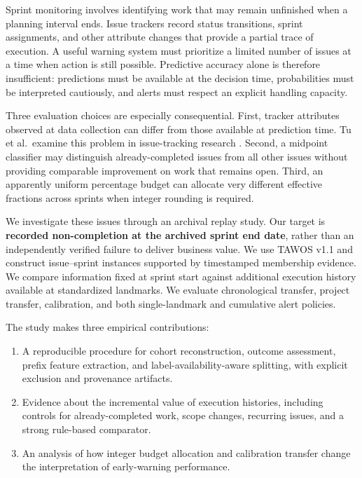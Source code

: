 \documentclass[11pt,a4paper]{article}
\providecommand{\tightlist}{\setlength{\itemsep}{0pt}\setlength{\parskip}{0pt}}
\begin{document}
Sprint monitoring involves identifying work that may remain unfinished when a planning interval ends. Issue trackers record status transitions, sprint assignments, and other attribute changes that provide a partial trace of execution. A useful warning system must prioritize a limited number of issues at a time when action is still possible. Predictive accuracy alone is therefore insufficient: predictions must be available at the decision time, probabilities must be interpreted cautiously, and alerts must respect an explicit handling capacity.

Three evaluation choices are especially consequential. First, tracker attributes observed at data collection can differ from those available at prediction time. Tu et al.~examine this problem in issue-tracking research \cite{tu2018careful}. Second, a midpoint classifier may distinguish already-completed issues from all other issues without providing comparable improvement on work that remains open. Third, an apparently uniform percentage budget can allocate very different effective fractions across sprints when integer rounding is required.

We investigate these issues through an archival replay study. Our target is \textbf{recorded non-completion at the archived sprint end date}, rather than an independently verified failure to deliver business value. We use TAWOS v1.1 \cite{tawosi2022tawos,tawosv11} and construct issue--sprint instances supported by timestamped membership evidence. We compare information fixed at sprint start against additional execution history available at standardized landmarks. We evaluate chronological transfer, project transfer, calibration, and both single-landmark and cumulative alert policies.

The study makes three empirical contributions:

\begin{enumerate}
\def\labelenumi{\arabic{enumi}.}
\tightlist
\item
  A reproducible procedure for cohort reconstruction, outcome assessment, prefix feature extraction, and label-availability-aware splitting, with explicit exclusion and provenance artifacts.
\item
  Evidence about the incremental value of execution histories, including controls for already-completed work, scope changes, recurring issues, and a strong rule-based comparator.
\item
  An analysis of how integer budget allocation and calibration transfer change the interpretation of early-warning performance.
\end{enumerate}
\end{document}
